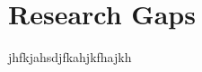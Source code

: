 \renewcommand{\baselinestretch}{1.5}\normalsize

\chapter{Research Gaps}


\label{Chapter Research Gaps}

jhfkjahsdjfkahjkfhajkh